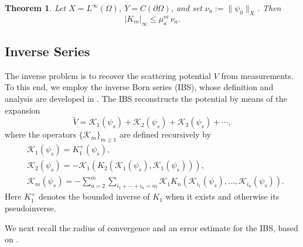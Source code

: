 \documentclass[12pt,reqno]{amsart}
\newtheorem{thm}{Theorem}[section]
\begin{document}
\begin{thm}\label{bound of forward anti}
Let $X=L^{\infty}(\Omega)$, $Y=C(\partial\Omega)$, and set $\nu_a:=\|\psi_0\|_{X}$. Then
\[
    |K_m|_{\infty}\leq \mu_a^m\,\nu_a.
\]
\end{thm}

\subsection{Inverse Series}
The inverse problem is to recover the scattering potential $V$ from measurements. To this end, we employ the inverse Born series (IBS), whose definition and analysis are developed in \cite{hoskinsAnalysisInverseBorn2022}. The IBS reconstructs the potential by means of the expansion
\[
    \tilde{V}
    =
    \mathcal{K}_1(\psi_s)+\mathcal{K}_2(\psi_s)+\mathcal{K}_3(\psi_s)+\cdots,
\]
where the operators $\{\mathcal{K}_m\}_{m\ge1}$ are defined recursively by
\begin{align*}
& \mathcal{K}_1(\psi_s)=K_1^{+}(\psi_s), \\
& \mathcal{K}_2(\psi_s)=-\mathcal{K}_1\!\left(K_2\!\left(\mathcal{K}_1(\psi_s), \mathcal{K}_1(\psi_s)\right)\right), \\
& \mathcal{K}_m(\psi_s)=-\sum_{n=2}^m \sum_{i_1+\cdots+i_n=m}
\mathcal{K}_1 K_n\!\left(\mathcal{K}_{i_1}(\psi_s), \ldots, \mathcal{K}_{i_n}(\psi_s)\right).
\end{align*}
Here $K_1^{+}$ denotes the bounded inverse of $K_1$ when it exists and otherwise its pseudoinverse.

We next recall the radius of convergence and an error estimate for the IBS, based on \cite{hoskinsAnalysisInverseBorn2022}.
\end{document}
